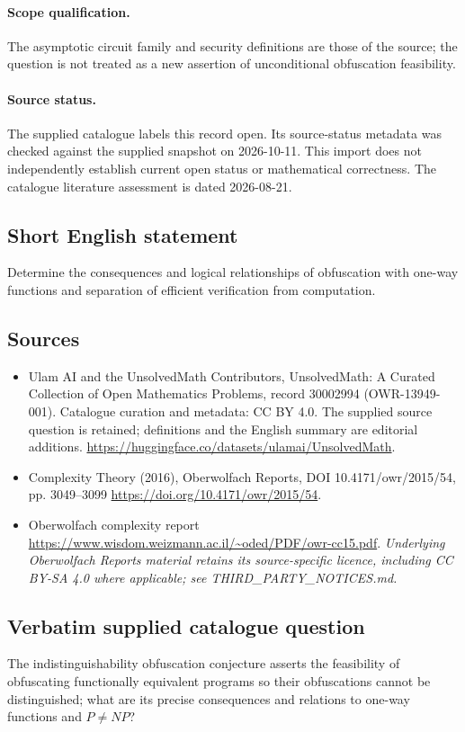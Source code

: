 \documentclass[11pt]{article}
\begin{document}
\paragraph{Scope qualification.}
The asymptotic circuit family and security definitions are those of the source; the question is not treated as a new assertion of unconditional obfuscation feasibility.
\paragraph{Source status.}
The supplied catalogue labels this record open. Its source-status metadata was checked against the supplied snapshot on 2026-10-11. This import does not independently establish current open status or mathematical correctness. The catalogue literature assessment is dated 2026-08-21.
\subsection{Short English statement}
Determine the consequences and logical relationships of obfuscation with one-way functions and separation of efficient verification from computation.
\subsection{Sources}
\begin{itemize}
\item[S1] Ulam AI and the UnsolvedMath Contributors, UnsolvedMath: A Curated Collection of Open Mathematics Problems, record 30002994 (OWR-13949-001). Catalogue curation and metadata: CC BY 4.0. The supplied source question is retained; definitions and the English summary are editorial additions.
\url{https://huggingface.co/datasets/ulamai/UnsolvedMath}.
\item[S2] Complexity Theory (2016), Oberwolfach Reports, DOI 10.4171/owr/2015/54, pp. 3049--3099
\url{https://doi.org/10.4171/owr/2015/54}.
\item[S3] Oberwolfach complexity report
\url{https://www.wisdom.weizmann.ac.il/~oded/PDF/owr-cc15.pdf}.
\textit{Underlying Oberwolfach Reports material retains its source-specific licence, including CC BY-SA 4.0 where applicable; see THIRD\_PARTY\_NOTICES.md.}
\end{itemize}
\subsection{Verbatim supplied catalogue question}
The indistinguishability obfuscation conjecture asserts the feasibility of obfuscating functionally equivalent programs so their obfuscations cannot be distinguished; what are its precise consequences and relations to one-way functions and $P\neq NP$?
\end{document}
